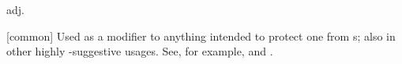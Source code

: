  adj.

[common] Used as a modifier to anything intended to protect one from s; also in other highly -suggestive
usages. See, for example,  and .

